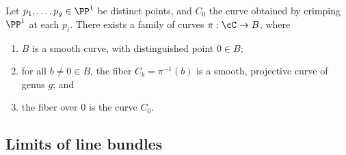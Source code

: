 %
%


\begin{lemma}\label{specialization to cuspidal curve}
Let $p_1,\dots,p_g \in \PP^1$ be distinct points, and $C_0$ the curve obtained by 
crimping $\PP^1$ at each $p_i$. There exists a family of curves $\pi : \cC \to B$, where
\begin{enumerate}
\item $B$ is a smooth curve, with distinguished point $0 \in B$;
\item for all $b \neq 0 \in B$, the fiber $C_b = \pi^{-1}(b)$ is a smooth, projective curve of genus $g$;  and
\item the fiber over $0$ is the curve $C_0$.
\end{enumerate}
\end{lemma}


\subsection{Limits of line bundles}\label{line bundle limits}

